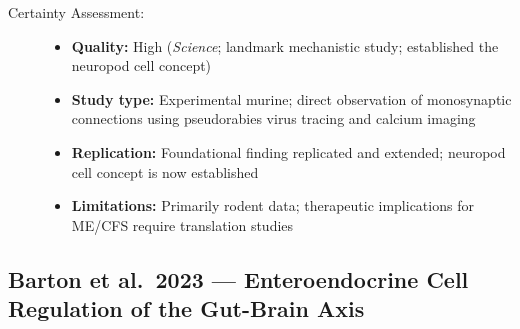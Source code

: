 \begin{description}
    \item[Certainty Assessment:]
    \begin{itemize}
        \item \textbf{Quality:} High (\textit{Science}; landmark mechanistic study; established the neuropod cell concept)
        \item \textbf{Study type:} Experimental murine; direct observation of monosynaptic connections using pseudorabies virus tracing and calcium imaging
        \item \textbf{Replication:} Foundational finding replicated and extended; neuropod cell concept is now established
        \item \textbf{Limitations:} Primarily rodent data; therapeutic implications for ME/CFS require translation studies
    \end{itemize}
\end{description}

\subsection{Barton et al.\ 2023 --- Enteroendocrine Cell Regulation of the Gut-Brain Axis}

